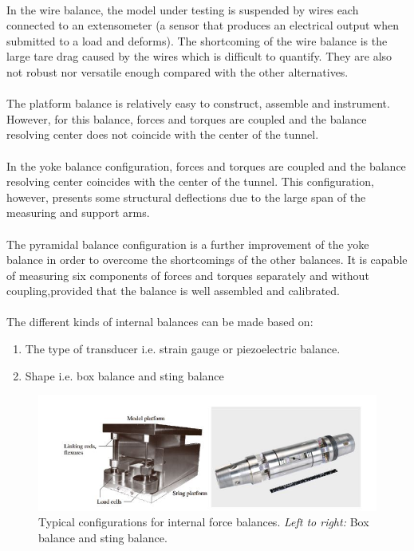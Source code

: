 \paragraph{}In the wire balance, the model under testing is suspended by wires each connected to an extensometer (a sensor that produces an electrical output when submitted to a load and deforms). The shortcoming of the wire balance is the large tare drag caused by the wires which is difficult to quantify. They are also not robust nor versatile enough compared with the other alternatives. 
\paragraph{}The platform balance is relatively easy to construct, assemble and instrument. However, for this balance, forces and torques are coupled and the balance resolving center does not coincide with the center of the tunnel. 
\paragraph{}In the yoke balance configuration, forces and torques are coupled and the balance resolving center coincides with the center of the tunnel. This configuration, however, presents some structural deflections due to the large span of the measuring and support arms.
\paragraph{}The pyramidal balance configuration is a further improvement of the yoke balance in order to overcome the shortcomings of the other balances. It is capable of measuring six components of forces and
torques separately and without coupling,provided that the balance is well assembled and calibrated.

\paragraph{}The different kinds of internal balances can be made based on:
\begin{enumerate}
\item The type of transducer i.e. strain gauge or piezoelectric balance.
\item Shape i.e. box balance and sting balance
\end{enumerate} 
\begin{center}
	\begin{figure}[!h]
	\centering
	\includegraphics{Figures/Fig7}
	\caption{Typical configurations for internal force balances. \textit{Left to right:} Box balance and sting balance.}
	\end{figure}
\end{center}

